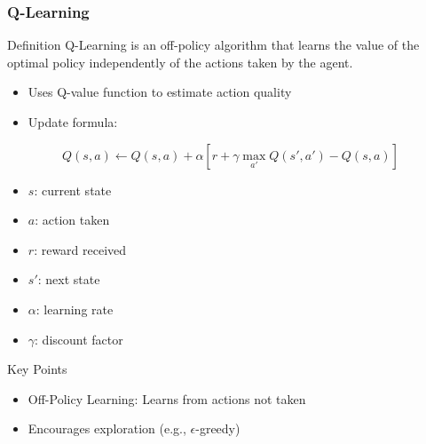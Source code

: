 \documentclass[aspectratio=169]{beamer}
\begin{document}
\begin{frame}[fragile]
    \frametitle{Q-Learning}
    
    \begin{block}{Definition}
        Q-Learning is an off-policy algorithm that learns the value of the optimal policy independently of the actions taken by the agent.
    \end{block}
    
    \begin{itemize}
        \item Uses Q-value function to estimate action quality
        \item Update formula:
    \end{itemize}
    
    \begin{equation}
        Q(s, a) \leftarrow Q(s, a) + \alpha [r + \gamma \max_{a'} Q(s', a') - Q(s, a)]
    \end{equation}
    
    \begin{itemize}
        \item $s$: current state
        \item $a$: action taken
        \item $r$: reward received
        \item $s'$: next state
        \item $\alpha$: learning rate
        \item $\gamma$: discount factor
    \end{itemize}

    \begin{block}{Key Points}
        \begin{itemize}
            \item Off-Policy Learning: Learns from actions not taken
            \item Encourages exploration (e.g., $\epsilon$-greedy)
        \end{itemize}
    \end{block}
\end{frame}
\end{document}
